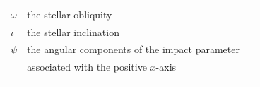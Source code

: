 \documentclass[modern]{aastex631}
\begin{document}
\begin{table}[]
\begin{tabular}{lll}
    $\omega$                         & the stellar obliquity                                                                &                                                         \\
    $\iota$                          & the stellar inclination                                                             &                                                        \\
    $\psi$                           & the angular components of the impact parameter \\
                                     &  associated with the positive $x$-axis &                                            \\
                                     &                                                                                      &                                                         \\ \hline
    \end{tabular}
    \end{table}



\end{document}
